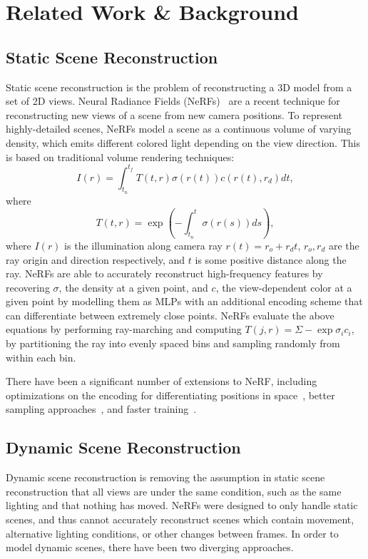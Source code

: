 \section*{Related Work \& Background}

\subsection*{Static Scene Reconstruction}

Static scene reconstruction is the problem of reconstructing a 3D model from a set of 2D views.
Neural Radiance Fields (NeRFs)~\cite{mildenhall2020nerf} are a recent technique for reconstructing new views of a scene from new camera positions. To represent highly-detailed scenes, NeRFs model a scene as a continuous volume of varying density, which emits different colored light depending on the view direction. This is based on traditional volume rendering techniques:
\[ I(r) = \int_{t_n}^{t_f} T(t, r) \sigma(r(t)) c(r(t), r_d)dt, \]
where 
\[ T(t, r) = \exp(-\int_{t_n}^{t} \sigma(r(s))ds), \]
\noindent
where $I(r)$ is the illumination along camera ray $r(t) = r_o + r_d t$, $r_o, r_d$ are the ray origin and direction respectively, and $t$ is some positive distance along the ray. NeRFs are able to accurately reconstruct high-frequency features by recovering $\sigma$, the density at a given point, and $c$, the view-dependent color at a given point by modelling them as MLPs with an additional encoding scheme that can differentiate between extremely close points. NeRFs evaluate the above equations by performing ray-marching and computing $T(j,r) = \Sigma -\exp\sigma_i c_i$, by partitioning the ray into evenly spaced bins and sampling randomly from within each bin.

There have been a significant number of extensions to NeRF, including optimizations on the encoding for differentiating positions in space~\cite{tancik2020fourfeat}, better sampling approaches~\cite{barron2021mipnerf}, and faster training~\cite{yu2021plenoxels}.

\subsection*{Dynamic Scene Reconstruction}

Dynamic scene reconstruction is removing the assumption in static scene reconstruction that all views are under the same condition, such as the same lighting and that nothing has moved.
NeRFs were designed to only handle static scenes, and thus cannot accurately reconstruct scenes which contain movement, alternative lighting conditions, or other changes between frames.
In order to model dynamic scenes, there have been two diverging approaches.

